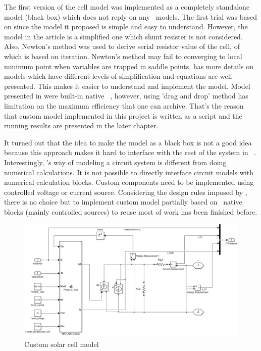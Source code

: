 The first version of the cell model was implemented as a completely standalone model (black box) which does not reply on any \simulink~models. The first trial was based on \cite{RN26} since the model it proposed is simple and easy to understand. However, the model in the article is a simplified one which shunt resister is not considered. Also, Newton's method was used to derive serial resistor value of the cell, of which is based on iteration. Newton's method may fail to converging to local minimum point when variables are trapped in saddle points. 
\cite{RN24} has more details on models which have different levels of simplification and equations are well presented. This makes it easier to understand and implement the model. Model presented in \cite{RN24} were built-in native \simulink~, however, using 'drag and drop' method has limitation on the maximum efficiency that one can archive. That's the reason that custom model implemented in this project is written as a script and the running results are presented in the later chapter.

It turned out that the idea to make the model as a black box is not a good idea because this approach makes it hard to interface with the rest of the system in \simulink~. Interestingly, \simulink's way of modeling a circuit system is different from doing numerical calculations. It is not possible to directly interface circuit models with numerical calculation blocks. Custom components need to be implemented using controlled voltage or current source. Considering the design rules imposed by \simulink, there is no choice but to implement custom model partially based on \simulink~native blocks (mainly controlled sources) to reuse most of work has been finished before. 
\begin{figure}[h]
     \centering
     \includegraphics[width = 1\textwidth]{figures/custome_pv}
     \caption{Custom solar cell model}
     \label{fig:cell_model}
\end{figure}

